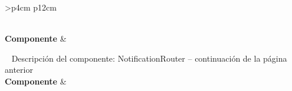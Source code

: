 \begin{longtable}{
    >{}p{4cm}
    p{12cm}
    }
    \caption{Descripción del componente:  NotificationRouter} \label{table:descripcion_notificationrouter} \\
    \toprule
    \textbf{Componente} &  \\
    \endfirsthead
    
    {{ \tablename\ \thetable{} Descripción del componente:  NotificationRouter -- continuación de la página anterior}} \\
    \toprule
    \textbf{Componente} &  \\
    \midrule
    \endhead
    
    \midrule
     \\ 
    \endfoot
    
    \bottomrule
    \endlastfoot
    

\end{longtable}
